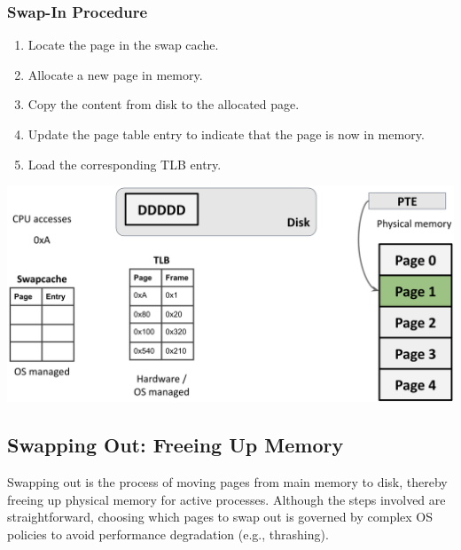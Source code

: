 \documentclass[../../compsys.tex]{subfiles}
\begin{document}
\subsubsection{Swap-In Procedure}
\noindent
\begin{minipage}{0.45\textwidth}
\begin{enumerate}
    \item Locate the page in the swap cache.
    \item Allocate a new page in memory.
    \item Copy the content from disk to the allocated page.
    \item Update the page table entry to indicate that the page is now in memory.
    \item Load the corresponding TLB entry.
\end{enumerate}
\end{minipage}%
\hfill
\begin{minipage}{0.45\textwidth}
\begin{center}
\includegraphics[width=1.1\textwidth]{chapters/L5/images/swapin.png}
\end{center}
\end{minipage}
\newpage
\subsection{Swapping Out: Freeing Up Memory}
Swapping out is the process of moving pages from main memory to disk, thereby freeing up physical memory for active processes. Although the steps involved are straightforward, choosing which pages to swap out is governed by complex OS policies to avoid performance degradation (e.g., thrashing).
\end{document}
